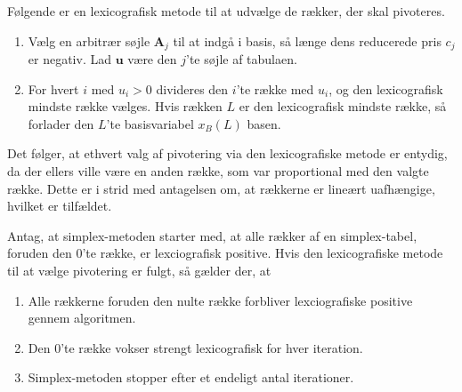 %
Følgende er en lexicografisk metode til at udvælge de rækker, der skal pivoteres.
\begin{enumerate}
\item Vælg en arbitrær søjle $\textbf{A}_j$ til at indgå i basis, så længe dens reducerede pris $c_j$ er negativ.
Lad $\textbf{u}$ være den $j$'te søjle af tabulaen.
\item For hvert $i$ med $u_i>0$ divideres den $i$'te række med $u_i$, og den lexicografisk mindste række vælges. 
Hvis rækken $L$ er den lexicografisk mindste række, så forlader den $L$'te basisvariabel $x_B(L)$ basen.
\end{enumerate}
%
Det følger, at ethvert valg af pivotering via den lexicografiske metode er entydig, da der ellers ville være en anden række, som var proportional med den valgte række. 
Dette er i strid med antagelsen om, at rækkerne er lineært uafhængige, hvilket er tilfældet.
%
\begin{thm}{}{}
Antag, at simplex-metoden starter med, at alle rækker af en simplex-tabel, foruden den $0$'te række, er lexciografisk positive. Hvis den lexicografiske metode til at vælge pivotering er fulgt, så gælder der, at
\begin{enumerate}[label=(\alph*)]
\item Alle rækkerne foruden den nulte række forbliver lexciografiske positive gennem algoritmen.
\item Den $0$'te række vokser strengt lexicografisk for hver iteration.
\item Simplex-metoden stopper efter et endeligt antal iterationer. 
\end{enumerate}
\end{thm}
%

